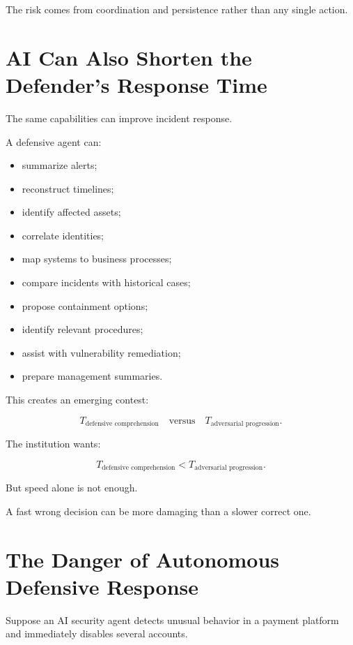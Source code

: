 The risk comes from coordination and persistence rather than any single action.

\section{AI Can Also Shorten the Defender's Response Time}

The same capabilities can improve incident response.

A defensive agent can:

\begin{itemize}
    \item summarize alerts;
    \item reconstruct timelines;
    \item identify affected assets;
    \item correlate identities;
    \item map systems to business processes;
    \item compare incidents with historical cases;
    \item propose containment options;
    \item identify relevant procedures;
    \item assist with vulnerability remediation;
    \item prepare management summaries.
\end{itemize}

This creates an emerging contest:

\begin{equation}
T_{\text{defensive comprehension}}
\quad \text{versus} \quad
T_{\text{adversarial progression}}.
\end{equation}

The institution wants:

\begin{equation}
T_{\text{defensive comprehension}}
<
T_{\text{adversarial progression}}.
\end{equation}

But speed alone is not enough.

A fast wrong decision can be more damaging than a slower correct one.

\section{The Danger of Autonomous Defensive Response}

Suppose an AI security agent detects unusual behavior in a payment platform and immediately disables several accounts.

